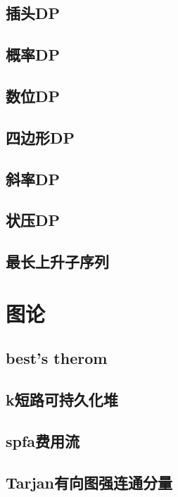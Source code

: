 \documentclass[a4paper]{article}
\begin{document}
\subsection{插头DP}

\subsection{概率DP}

\subsection{数位DP}

\subsection{四边形DP}

\subsection{斜率DP}

\subsection{状压DP}

\subsection{最长上升子序列}

\section{图论}
\subsection{best's therom}

\subsection{k短路可持久化堆}

\subsection{spfa费用流}

\subsection{Tarjan有向图强连通分量}

\end{document}
